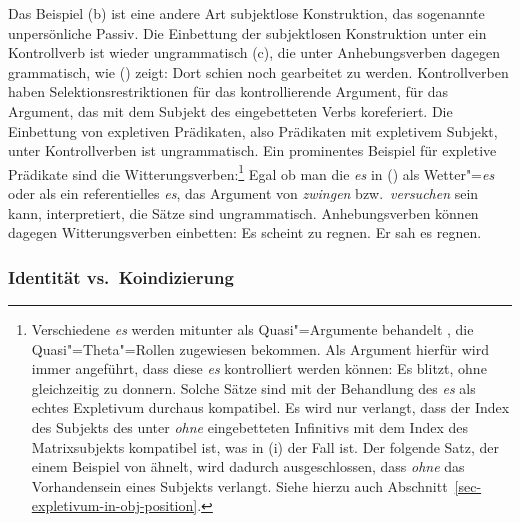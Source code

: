 \noindent
Das Beispiel (b) ist eine andere Art subjektlose Konstruktion, das sogenannte unpersönliche Passiv.
\eal
{}
\zl
Die Einbettung der subjektlosen Konstruktion unter ein Kontrollverb ist wieder ungrammatisch (c), die
unter Anhebungsverben dagegen grammatisch, wie () zeigt:
\ea
Dort schien noch gearbeitet zu werden.
\z
Kontrollverben haben Selektionsrestriktionen für das kontrollierende Argument, \dash für das Argument,
das mit dem Subjekt des eingebetteten Verbs koreferiert. Die Einbettung von expletiven Prädikaten,
also Prädikaten mit expletivem Subjekt, unter Kontrollverben ist ungrammatisch. Ein prominentes
Beispiel für expletive Prädikate sind die Witterungsverben:\footnote{
        Verschiedene \emph{es} werden mitunter als Quasi"=Argumente behandelt \citep[]{Chomsky93a},
        die Quasi"=Theta"=Rollen zugewiesen bekommen.
        Als Argument hierfür wird immer angeführt, dass diese \emph{es} kontrolliert werden können:
        \ea
        Es blitzt, ohne gleichzeitig zu donnern.
        \z
        Solche Sätze sind mit der Behandlung des \emph{es} als echtes Expletivum durchaus
        kompatibel. Es wird nur verlangt, dass der Index des Subjekts des unter \emph{ohne} eingebetteten
        Infinitivs mit dem Index des Matrixsubjekts kompatibel ist, was in (i) der Fall ist.
        Der folgende Satz, der einem Beispiel von \citet[]{Fanselow91a} ähnelt,
        wird dadurch ausgeschlossen, dass \emph{ohne} das Vorhandensein eines Subjekts
        verlangt.
        \z
        Siehe hierzu auch Abschnitt~\ref{sec-expletivum-in-obj-position}.%
}
\eal
{}
\zl
Egal ob man die \emph{es} in () als Wetter"=\emph{es} oder als ein referentielles \emph{es}, das
Argument von \emph{zwingen} bzw.\ \emph{versuchen} sein kann, interpretiert, die Sätze sind ungrammatisch.
Anhebungsverben können dagegen Witterungsverben einbetten:
\eal
\ex Es scheint zu regnen.
\ex Er sah es regnen.
\zl


\subsubsection{Identität vs.\ Koindizierung}
\label{sec-rais-contr-identity-coindexing}

